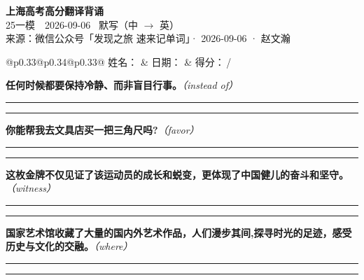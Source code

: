 \documentclass[11pt,a4paper]{article}
\newcommand{\num}[1]{\makebox[1.9em][r]{#1.}\hspace{0.3em}}
\newcommand{\wline}{\noindent\rule{\linewidth}{0.4pt}}
\newcommand{\prompt}[1]{\emph{\textcolor{tipblue}{\small（#1）}}}
\begin{document}
\pagestyle{plain}
\begin{center}
{\LARGE\bfseries 上海高考高分翻译背诵 }\\[0.25em]
{\large 25一模　2026-09-06 \quad\ 默写（中 $\to$ 英）}\\[0.35em]
{\footnotesize 来源：微信公众号「发现之旅 速来记单词」· 2026-09-06 · 赵文瀚}
\end{center}

\vspace{0.4em}
\noindent\begin{tabular}{@{}p{0.33\textwidth}@{}p{0.34\textwidth}@{}p{0.33\textwidth}@{}}
姓名：\underline{\hspace{2.0cm}} & 日期：\underline{\hspace{2.0cm}} & 得分：\underline{\hspace{1.4cm}}\,/ \\
\end{tabular}

\vspace{0.5em}

\vspace{0.8em}
\num{1}\textbf{任何时候都要保持冷静、而非盲目行事。}\prompt{instead of}

\vspace{0.3em}

\wline\vspace{0.3em}
\wline

\num{2}\textbf{你能帮我去文具店买一把三角尺吗?}\prompt{favor}

\vspace{0.3em}

\wline\vspace{0.3em}
\wline

\num{3}\textbf{这枚金牌不仅见证了该运动员的成长和蜕变，更体现了中国健儿的奋斗和坚守。}\prompt{witness}

\vspace{0.3em}

\wline\vspace{0.3em}
\wline

\num{4}\textbf{国家艺术馆收藏了大量的国内外艺术作品，人们漫步其间,探寻时光的足迹，感受历史与文化的交融。}\prompt{where}

\vspace{0.3em}

\wline\vspace{0.3em}
\wline
\end{document}
